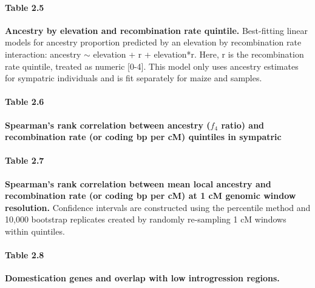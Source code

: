 \paragraph*{Table 2.5}
\label{tbl_elev_r_interaction_5}
{\bf Ancestry by elevation and recombination rate quintile.} Best-fitting linear models for ancestry proportion predicted by an elevation by recombination rate interaction: \mexicana ancestry $\sim$ elevation + r + elevation*r. Here, r is the recombination rate quintile, treated as numeric [0-4]. This model only uses ancestry estimates for sympatric individuals and is fit separately for maize and \mexicana samples.


\paragraph*{Table 2.6}
\label{spearmans_rho_f4_sympatric_mexicana_pop22}
{\bf Spearman's rank correlation between ancestry ($f_4$ ratio) and recombination rate (or coding bp per cM) quintiles in sympatric \mexicana}
{}

\paragraph*{Table 2.7}
\label{spearmans_rho_local_ancestry}
{\bf Spearman's rank correlation between mean \mexicana local ancestry and recombination rate (or coding bp per cM) at 1 cM genomic window resolution.} Confidence intervals are constructed using the percentile method and 10,000 bootstrap replicates created by randomly re-sampling 1 cM windows within quintiles.


\paragraph*{Table 2.8}
\label{genes_outliers}
{\bf Domestication genes and overlap with low introgression regions.}

\newpage


